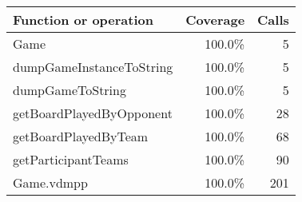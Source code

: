 \bigskip
\begin{longtable}{|l|r|r|}
\hline
Function or operation & Coverage & Calls \\
\hline
\hline
Game & 100.0\% & 5 \\
\hline
dumpGameInstanceToString & 100.0\% & 5 \\
\hline
dumpGameToString & 100.0\% & 5 \\
\hline
getBoardPlayedByOpponent & 100.0\% & 28 \\
\hline
getBoardPlayedByTeam & 100.0\% & 68 \\
\hline
getParticipantTeams & 100.0\% & 90 \\
\hline
\hline
Game.vdmpp & 100.0\% & 201 \\
\hline
\end{longtable}

